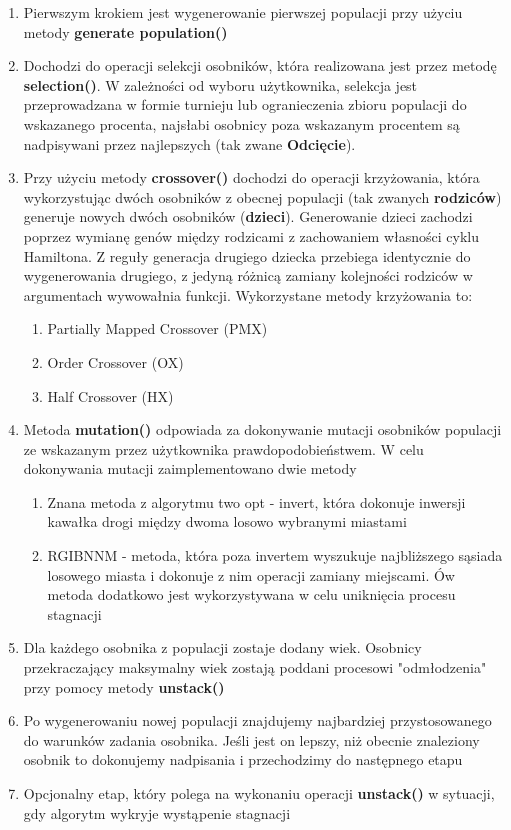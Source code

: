   \begin{enumerate}
    \item Pierwszym krokiem jest wygenerowanie pierwszej populacji przy użyciu metody \textbf{generate population()}
    \item Dochodzi do operacji selekcji osobników, która realizowana jest przez metodę \textbf{selection()}. 
    W zależności od wyboru użytkownika, selekcja jest przeprowadzana w formie turnieju lub ogranieczenia zbioru populacji do wskazanego procenta, najsłabi osobnicy poza wskazanym procentem są nadpisywani przez najlepszych (tak zwane \textbf{Odcięcie}).
    \item Przy użyciu metody \textbf{crossover()} dochodzi do operacji krzyżowania, która wykorzystując dwóch osobników z obecnej populacji (tak zwanych \textbf{rodziców}) generuje nowych dwóch osobników (\textbf{dzieci}).
    Generowanie dzieci zachodzi poprzez wymianę genów między rodzicami z zachowaniem własności cyklu Hamiltona. Z reguły generacja drugiego dziecka przebiega identycznie do wygenerowania drugiego,
    z jedyną różnicą zamiany kolejności rodziców w argumentach wywowałnia funkcji. Wykorzystane metody krzyżowania to:
    \begin{enumerate}
      \item Partially Mapped Crossover (PMX)
      \item Order Crossover (OX)
      \item Half Crossover (HX)
    \end{enumerate}
    \item Metoda \textbf{mutation()} odpowiada za dokonywanie mutacji osobników populacji ze wskazanym przez użytkownika prawdopodobieństwem.
    W celu dokonywania mutacji zaimplementowano dwie metody
    \begin{enumerate}
      \item Znana metoda z algorytmu two opt - invert, która dokonuje inwersji kawałka drogi między dwoma losowo wybranymi miastami
      \item RGIBNNM - metoda, która poza invertem wyszukuje najbliższego sąsiada losowego miasta i dokonuje z nim operacji zamiany miejscami. Ów metoda dodatkowo jest
      wykorzystywana w celu uniknięcia procesu stagnacji
    \end{enumerate}
    \item Dla każdego osobnika z populacji zostaje dodany wiek. Osobnicy przekraczający maksymalny wiek zostają poddani procesowi "odmłodzenia" przy pomocy metody \textbf{unstack()}
    \item Po wygenerowaniu nowej populacji znajdujemy najbardziej przystosowanego do warunków zadania osobnika. Jeśli jest on lepszy, niż obecnie znaleziony osobnik
    to dokonujemy nadpisania i przechodzimy do następnego etapu
    \item Opcjonalny etap, który polega na wykonaniu operacji \textbf{unstack()} w sytuacji, gdy algorytm wykryje wystąpenie stagnacji
  \end{enumerate}
